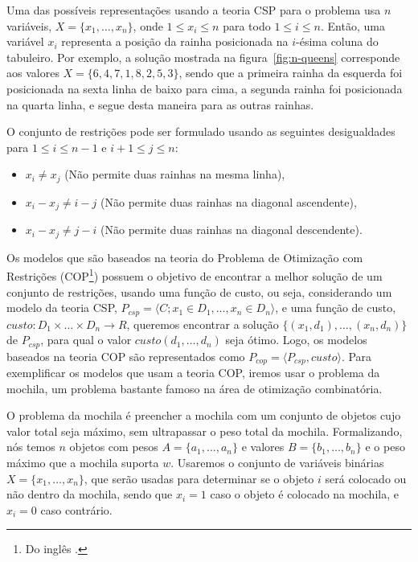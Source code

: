 Uma das possíveis representações usando a teoria CSP para o problema usa
$n$ variáveis, $X = \{x_{1}, \ldots, x_{n}\}$, onde $1 \leq x_{i} \leq
n$ para todo $1 \leq i \leq n$. Então, uma variável $x_{i}$ representa a
posição da rainha posicionada na $i$-ésima coluna do tabuleiro. Por
exemplo, a solução mostrada na figura~\ref{fig:n-queens} corresponde aos
valores $X = \{6, 4, 7, 1, 8, 2, 5, 3\}$, sendo que a primeira rainha da
esquerda foi posicionada na sexta linha de baixo para cima, a segunda
rainha foi posicionada na quarta linha, e segue desta maneira para as
outras rainhas.

O conjunto de restrições pode ser formulado usando as seguintes
desigualdades para $1 \leq i \leq n - 1$ e $i + 1 \leq j \leq n$:

\begin{itemize}

    \item{$x_i \neq x_j$ (Não permite duas rainhas na mesma linha),}

    \item{$x_i - x_j \neq i - j$ (Não permite duas rainhas na diagonal
        ascendente),}

    \item{$x_i - x_j \neq j - i$ (Não permite duas rainhas na diagonal
        descendente).}

\end{itemize}

Os modelos que são baseados na teoria do Problema de Otimização com
Restrições (COP\footnote{Do inglês .}) possuem o objetivo de encontrar a melhor solução de um
conjunto de restrições, usando uma função de custo, ou seja,
considerando um modelo da teoria CSP, $P_{csp} = \langle C; x_{1} \in
D_{1}, \ldots, x_{n} \in D_{n} \rangle$, e uma função de custo, $custo:
D_{1} \times \ldots \times D_{n} \to R$, queremos encontrar a solução
$\{(x_{1}, d_{1}), \ldots, (x_{n}, d_{n})\}$ de $P_{csp}$, para qual o
valor $custo(d_{1}, \ldots, d_{n})$ seja ótimo. Logo, os modelos
baseados na teoria COP são representados como $P_{cop} = \langle
P_{csp}, custo \rangle$. Para exemplificar os modelos que usam a teoria
COP, iremos usar o problema da mochila, um problema bastante famoso na
área de otimização combinatória.

O problema da mochila é preencher a mochila com um conjunto de objetos
cujo valor total seja máximo, sem ultrapassar o peso total da mochila.
Formalizando, nós temos $n$ objetos com pesos $A = \{a_1, \ldots, a_n\}$
e valores $B = \{b_1, \ldots, b_n\}$ e o peso máximo que a mochila
suporta $w$. Usaremos o conjunto de variáveis binárias $X = \{x_1,
\ldots, x_n\}$, que serão usadas para determinar se o objeto $i$ será
colocado ou não dentro da mochila, sendo que $x_i = 1$ caso o objeto é
colocado na mochila, e $x_i = 0$ caso contrário.

